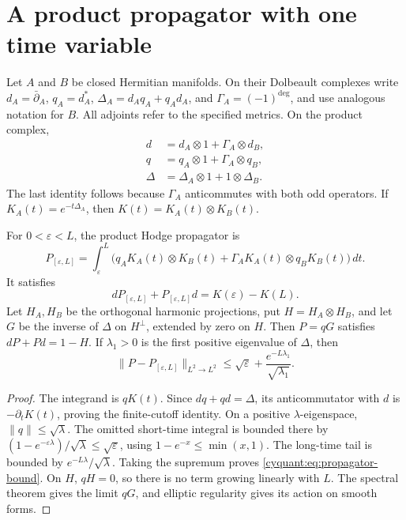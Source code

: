 \section{A product propagator with one time variable}
\label{cyquant:sec:propagator}

Let $A$ and $B$ be closed Hermitian manifolds.  On their Dolbeault
complexes write $d_A=\bar\partial_A$, $q_A=d_A^*$,
$\Delta_A=d_Aq_A+q_Ad_A$, and $\Gamma_A=(-1)^{\deg}$, and use analogous
notation for $B$.  All adjoints refer to the specified metrics.  On the
product complex,
\begin{equation}\label{cyquant:eq:product-operators}
 \begin{aligned}
 d&=d_A\otimes1+\Gamma_A\otimes d_B,\\
 q&=q_A\otimes1+\Gamma_A\otimes q_B,\\
 \Delta&=\Delta_A\otimes1+1\otimes\Delta_B.
 \end{aligned}
\end{equation}
The last identity follows because $\Gamma_A$ anticommutes with both odd
operators.  If $K_A(t)=e^{-t\Delta_A}$, then
$K(t)=K_A(t)\otimes K_B(t)$.

\begin{proposition}\label{cyquant:prop:product-propagator}
For $0<\varepsilon<L$, the product Hodge propagator is
\begin{equation}\label{cyquant:eq:propagator}
 P_{[\varepsilon,L]}=
 \int_{\varepsilon}^{L}
 \bigl(q_AK_A(t)\otimes K_B(t)
       +\Gamma_AK_A(t)\otimes q_BK_B(t)\bigr)\,dt.
\end{equation}
It satisfies
\[
 dP_{[\varepsilon,L]}+P_{[\varepsilon,L]}d=K(\varepsilon)-K(L).
\]
Let $H_A,H_B$ be the orthogonal harmonic projections, put
$H=H_A\otimes H_B$, and let $G$ be the inverse of $\Delta$ on $H^\perp$,
extended by zero on $H$.  Then $P=qG$ satisfies $dP+Pd=1-H$.
If $\lambda_1>0$ is the first positive eigenvalue of $\Delta$, then
\begin{equation}\label{cyquant:eq:propagator-bound}
 \|P-P_{[\varepsilon,L]}\|_{L^2\to L^2}
 \leq \sqrt{\varepsilon}+
             \frac{e^{-L\lambda_1}}{\sqrt{\lambda_1}}.
\end{equation}
\end{proposition}

\begin{proof}
The integrand is $qK(t)$.  Since $dq+qd=\Delta$, its anticommutator
with $d$ is $-\partial_tK(t)$, proving the finite-cutoff identity.
On a positive $\lambda$-eigenspace, $\|q\|\leq\sqrt\lambda$.
The omitted short-time integral is bounded there by
$(1-e^{-\varepsilon\lambda})/\sqrt\lambda\leq\sqrt\varepsilon$,
using $1-e^{-x}\leq\min(x,1)$.  The long-time tail is bounded by
$e^{-L\lambda}/\sqrt\lambda$.  Taking the supremum proves
\eqref{cyquant:eq:propagator-bound}.  On $H$, $qH=0$, so there is no
term growing linearly with $L$.  The spectral theorem gives the limit
$qG$, and elliptic regularity gives its action on smooth forms.
\end{proof}

